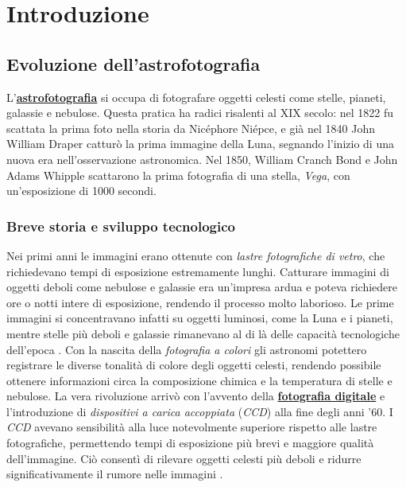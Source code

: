 \chapter{Introduzione} \label{chap:introduction}

\section{Evoluzione dell'astrofotografia} \label{sec:evolution}

L'\textbf{\href{https://it.wikipedia.org/wiki/Astrofotografia}{astrofotografia}} si occupa di fotografare oggetti celesti come stelle, pianeti, galassie e nebulose. Questa pratica ha radici risalenti al XIX secolo: nel 1822 fu scattata la prima foto nella storia da Nicéphore Niépce, e già nel 1840 John William Draper catturò la prima immagine della Luna, segnando l'inizio di una nuova era nell'osservazione astronomica. Nel 1850, William Cranch Bond e John Adams Whipple scattarono la prima fotografia di una stella, \textit{Vega}, con un'esposizione di 1000 secondi.

\subsection{Breve storia e sviluppo tecnologico} \label{subsec:history}

Nei primi anni le immagini erano ottenute con \textit{lastre fotografiche di vetro}, che richiedevano tempi di esposizione estremamente lunghi. Catturare immagini di oggetti deboli come nebulose e galassie era un'impresa ardua e poteva richiedere ore o notti intere di esposizione, rendendo il processo molto laborioso. Le prime immagini si concentravano infatti su oggetti luminosi, come la Luna e i pianeti, mentre stelle più deboli e galassie rimanevano al di là delle capacità tecnologiche dell'epoca \cite{astroph_hist}. 
Con la nascita della \textit{fotografia a colori} gli astronomi potettero registrare le diverse tonalità di colore degli oggetti celesti, rendendo possibile ottenere informazioni circa la composizione chimica e la temperatura di stelle e nebulose. La vera rivoluzione arrivò con l'avvento della \textbf{\href{https://it.wikipedia.org/wiki/Fotografia_digitale}{fotografia digitale}} e l'introduzione di \textit{dispositivi a carica accoppiata} (\textit{CCD}) alla fine degli anni '60. I \textit{CCD} avevano sensibilità alla luce notevolmente superiore rispetto alle lastre fotografiche, permettendo tempi di esposizione più brevi e maggiore qualità dell'immagine. Ciò consentì di rilevare oggetti celesti più deboli e ridurre significativamente il rumore nelle immagini \cite{multiwavelength_image_proc}.

